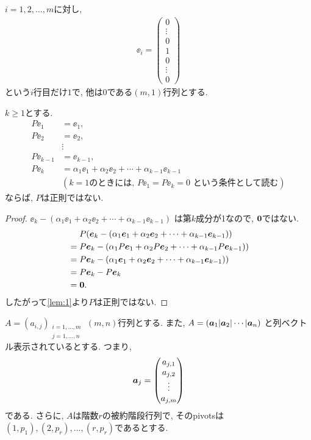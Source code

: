 $i=1,2,\ldots,m$に対し,
  \begin{align*}
    \ee_i=\begin{pmatrix}0\\\vdots\\0\\1\\0\\\vdots\\0\end{pmatrix}
  \end{align*}
という$i$行目だけ$1$で, 他は$0$である$(m,1)$行列とする.
\begin{lemma}
  \label{lem:2}
  $k\geq 1$とする.
  \begin{align*}
    P\ee_1&=\ee_1,\\
    P\ee_2&=\ee_2,\\
    &\vdots\\
    P\ee_{k-1}&=\ee_{k-1},\\
    P\ee_k&=\alpha_1\ee_1+\alpha_2\ee_2+\cdots+\alpha_{k-1}\ee_{k-1}\\
    &(\text{$k=1$のときには, $P\ee_1=P\ee_k=0$ という条件として読む})    
  \end{align*}
  ならば, $P$は正則ではない.
\end{lemma}
\begin{proof}
$\ee_k-(\alpha_1\ee_1+\alpha_2\ee_2+\cdots+\alpha_{k-1}\ee_{k-1})$
  は第$k$成分が1なので, $\boldsymbol{0}$ではない.
  \begin{align*}
    &\phantom{{}={}}P(\ee_k-(\alpha_1\ee_1+\alpha_2\ee_2+\cdots+\alpha_{k-1}\ee_{k-1}))\\
    &=
    P\ee_k-(\alpha_1P\ee_1+\alpha_2P\ee_2+\cdots+\alpha_{k-1}P\ee_{k-1}))\\
    &=
    P\ee_k-(\alpha_1\ee_1+\alpha_2\ee_2+\cdots+\alpha_{k-1}\ee_{k-1}))\\
    &=
    P\ee_k-P\ee_k\\
    &=\zzero.
  \end{align*}
  したがって\cref{lem:1}より$P$は正則ではない.
\end{proof}


$A=(a_{i,j})_{\substack{i=1,\ldots,m\\j=1,\ldots,n}}$
$(m,n)$行列とする.
また,
$A=(\boldsymbol{a}_1|\boldsymbol{a}_2|\cdots|\boldsymbol{a}_n)$
と列ベクトル表示されているとする.
つまり,
\begin{align*}
  \boldsymbol{a}_j=\begin{pmatrix}a_{j,1}\\a_{j,2}\\\vdots\\a_{j,m}\end{pmatrix}
\end{align*}
である. さらに, $A$は階数$r$の被約階段行列で,
そのpivotsは$(1,p_1),(2,p_r),\ldots,(r,p_r)$であるとする.

